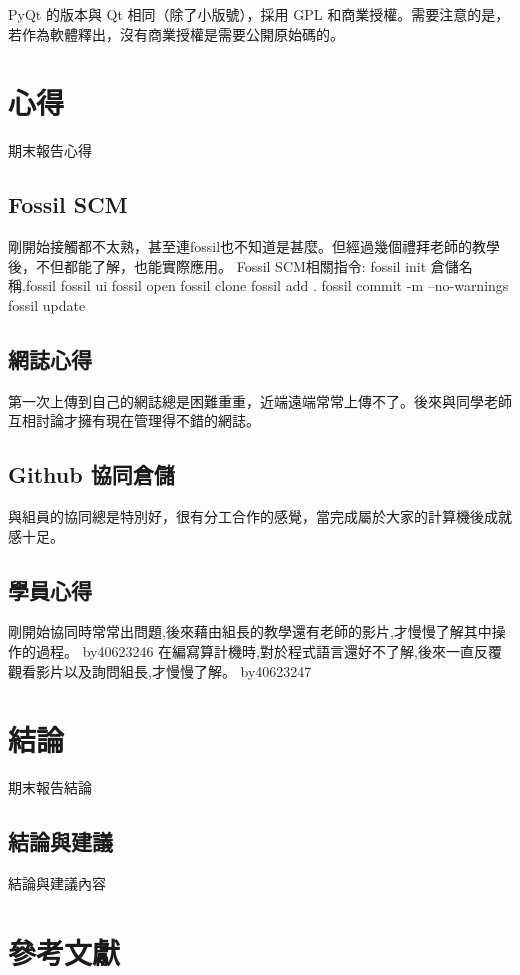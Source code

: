 \documentclass[12pt,,]{report}
\begin{document}
PyQt 的版本與 Qt 相同（除了小版號），採用 GPL
和商業授權。需要注意的是，若作為軟體釋出，沒有商業授權是需要公開原始碼的。

\hypertarget{ux5fc3ux5f97}{%
\chapter{心得}\label{ux5fc3ux5f97}}

期末報告心得

\hypertarget{fossil-scm}{%
\section{Fossil SCM}\label{fossil-scm}}

剛開始接觸都不太熟，甚至連fossil也不知道是甚麼。但經過幾個禮拜老師的教學後，不但都能了解，也能實際應用。
Fossil SCM相關指令: fossil init 倉儲名稱.fossil fossil ui fossil open
fossil clone fossil add . fossil commit -m --no-warnings fossil update

\hypertarget{ux7db2ux8a8cux5fc3ux5f97}{%
\section{網誌心得}\label{ux7db2ux8a8cux5fc3ux5f97}}

第一次上傳到自己的網誌總是困難重重，近端遠端常常上傳不了。後來與同學老師互相討論才擁有現在管理得不錯的網誌。

\hypertarget{github-ux5354ux540cux5009ux5132}{%
\section{Github 協同倉儲}\label{github-ux5354ux540cux5009ux5132}}

與組員的協同總是特別好，很有分工合作的感覺，當完成屬於大家的計算機後成就感十足。

\hypertarget{ux5b78ux54e1ux5fc3ux5f97}{%
\section{學員心得}\label{ux5b78ux54e1ux5fc3ux5f97}}

剛開始協同時常常出問題,後來藉由組長的教學還有老師的影片,才慢慢了解其中操作的過程。
by40623246
在編寫算計機時,對於程式語言還好不了解,後來一直反覆觀看影片以及詢問組長,才慢慢了解。
by40623247

\hypertarget{ux7d50ux8ad6}{%
\chapter{結論}\label{ux7d50ux8ad6}}

期末報告結論

\hypertarget{ux7d50ux8ad6ux8207ux5efaux8b70}{%
\section{結論與建議}\label{ux7d50ux8ad6ux8207ux5efaux8b70}}

結論與建議內容

\hypertarget{ux53c3ux8003ux6587ux737b}{%
\chapter{參考文獻}\label{ux53c3ux8003ux6587ux737b}}
\end{document}
